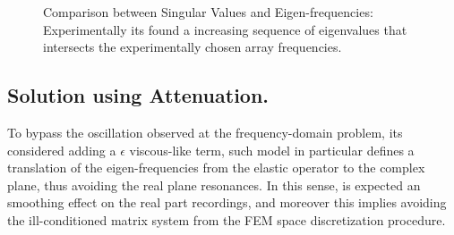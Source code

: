 \begin{figure}[!h]%
    \centering
    \qquad
    \caption{Comparison between Singular Values and Eigen-frequencies: Experimentally its found a increasing sequence of eigenvalues that intersects the experimentally chosen array frequencies.}%
    \label{EigenValuesComparison}%
\end{figure}


\subsection{Solution using Attenuation.}
To bypass the oscillation observed at the frequency-domain problem, its considered adding a $\epsilon$ viscous-like term, such model in particular defines a translation of the eigen-frequencies from the elastic operator to the complex plane, thus avoiding the real plane resonances. In this sense, is expected an smoothing effect on the real part recordings, and moreover this implies avoiding the ill-conditioned matrix system from the FEM space discretization procedure.

